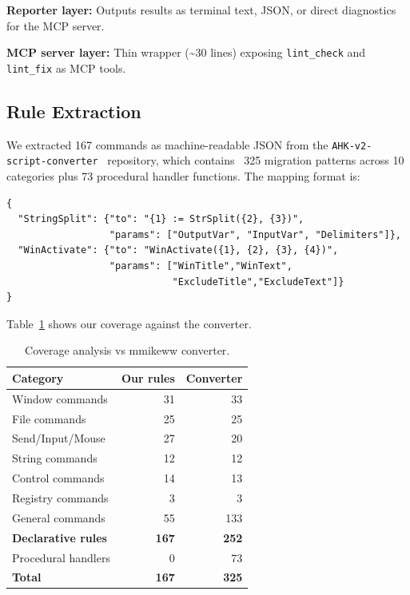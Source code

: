 \documentclass[11pt,a4paper]{article}
\begin{document}
\textbf{Reporter layer:} Outputs results as terminal text, JSON, or direct diagnostics for the MCP server.

\textbf{MCP server layer:} Thin wrapper ({\textasciitilde}30 lines) exposing \texttt{lint\_check} and \texttt{lint\_fix} as MCP tools.

\subsection{Rule Extraction}

We extracted 167 commands as machine-readable JSON from the \texttt{AHK-v2-script-converter}~\cite{converter} repository, which contains ~325 migration patterns across 10 categories plus 73 procedural handler functions. The mapping format is:

\begin{lstlisting}[style=ahk,frame=none,numbers=none]
{
  "StringSplit": {"to": "{1} := StrSplit({2}, {3})",
                  "params": ["OutputVar", "InputVar", "Delimiters"]},
  "WinActivate": {"to": "WinActivate({1}, {2}, {3}, {4})",
                  "params": ["WinTitle","WinText",
                             "ExcludeTitle","ExcludeText"]}
}
\end{lstlisting}

Table~\ref{tab:coverage} shows our coverage against the converter.

\begin{table}[h]
\centering\small
\caption{Coverage analysis vs mmikeww converter.}
\label{tab:coverage}
\begin{tabular}{lrr}
\toprule
\textbf{Category} & \textbf{Our rules} & \textbf{Converter} \\
\midrule
Window commands & 31 & ~33 \\
File commands & 25 & ~25 \\
Send/Input/Mouse & 27 & ~20 \\
String commands & 12 & ~12 \\
Control commands & 14 & ~13 \\
Registry commands & 3 & ~3 \\
General commands & 55 & ~133 \\
\midrule
\textbf{Declarative rules} & \textbf{167} & \textbf{252} \\
Procedural handlers & 0 & 73 \\
\midrule
\textbf{Total} & \textbf{167} & \textbf{325} \\
\bottomrule
\end{tabular}
\end{table}
\end{document}
